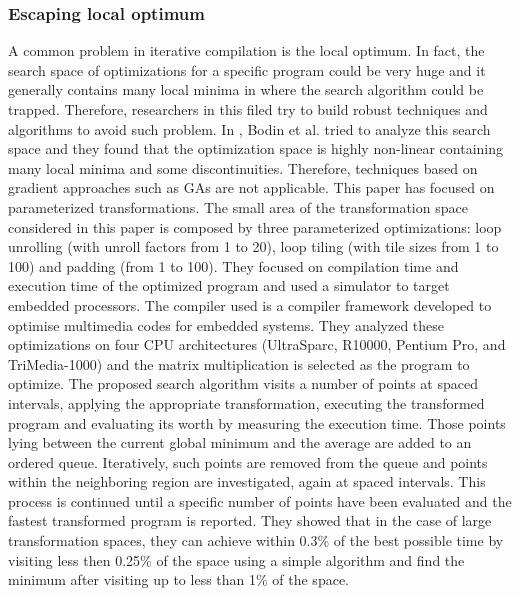 
\subsubsection{Escaping local optimum}


A common problem in iterative compilation is the local optimum. In fact, the search space of optimizations for a specific program could be very huge and it generally contains many local minima in where the search algorithm could be trapped\cite{bodin1998iterative}. Therefore, researchers in this filed try to build robust techniques and algorithms to avoid such problem.
In \cite{bodin1998iterative}, Bodin et al. tried to analyze this search space and they found that the optimization space is highly non-linear containing many local minima and some discontinuities. Therefore, techniques based on gradient approaches such as GAs are not applicable.
This paper has focused on parameterized transformations. The small area of the transformation space considered in this paper is composed by three parameterized optimizations: loop unrolling (with unroll factors from 1 to 20), loop tiling (with tile sizes from 1 to 100) and padding (from 1 to 100). They focused on compilation time and execution time of the optimized program and used a simulator to target embedded processors. The compiler used is a compiler framework developed to optimise multimedia codes for embedded systems.
They analyzed these optimizations on four CPU architectures (UltraSparc, R10000, Pentium Pro, and TriMedia-1000) and the matrix multiplication is selected as the program to optimize.
The proposed search algorithm visits a number of points at spaced intervals, applying the appropriate transformation, executing
the transformed program and evaluating its worth by measuring the execution time. Those points lying between
the current global minimum and the average are added to an ordered queue. Iteratively, such points are removed from the queue and points within the neighboring region are investigated, again at spaced intervals. This process is continued until a specific number of points have been evaluated and the fastest transformed program is reported.
They showed that in the case of large transformation spaces, they can achieve within 0.3\% of the best possible time by visiting less then 0.25\% of the space using a simple algorithm and find the minimum after visiting up to less than 1\% of the space.

